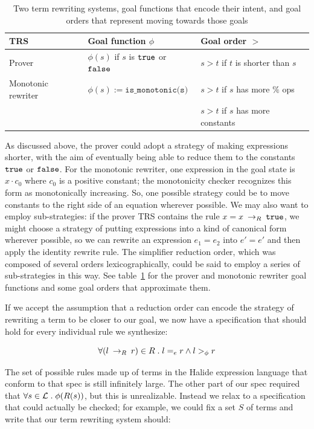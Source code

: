 \begin{table}[]
    \centering
    \begin{tabular}{|l|l|l|}
    \hline 
        TRS & Goal function $\phi$ & Goal order $>$ \\
        \hline 
        Prover &  $\phi(s)$ if $s$ is $\texttt{true}$ or $\texttt{false}$ & $s > t$ if $t$ is shorter than $s$\\
        \hline
        Monotonic rewriter & $\phi(s) := \texttt{is_monotonic(s)}$ & $s > t$ if $s$ has more $\%$ ops \\
                 & & $s > t$ if $s$ has more constants \\
        \hline
    \end{tabular}
    \caption{Two term rewriting systems, goal functions that encode their intent, and goal orders that represent moving towards those goals}
    \label{tab:trsspecs}
\end{table}

As discussed above, the prover could adopt a strategy of making expressions shorter, with the aim of eventually being able to reduce them to the constants $\texttt{true}$ or $\texttt{false}$. For the monotonic rewriter, one expression in the goal state is $x \cdot c_0$ where $c_0$ is a positive constant; the monotonicity checker recognizes this form as monotonically increasing. So, one possible strategy could be to move constants to the right side of an equation wherever possible. We may also want to employ sub-strategies: if the prover TRS contains the rule $x = x \:\rightarrow_{R}\: \texttt{true}$, we might choose a strategy of putting expressions into a kind of canonical form wherever possible, so we can rewrite an expression $e_1 = e_2$ into $e' = e'$ and then apply the identity rewrite rule. The simplifier reduction order, which was composed of several orders lexicographically, could be said to employ a series of sub-strategies in this way. See table~\ref{tab:trsspecs} for the prover and monotonic rewriter goal functions and some goal orders that approximate them.

If we accept the assumption that a reduction order can encode the strategy of rewriting a term to be closer to our goal, we now have a specification that should hold for every individual rule we synthesize:

\[ \forall (l \:\rightarrow_{R}\: r) \in R \;.\; l =_e r \wedge l >_{\phi} r
\]

The set of possible rules made up of terms in the Halide expression language that conform to that spec is still infinitely large. The other part of our spec required that $\forall s \in \mathcal{L} \;.\; \phi(R(s))$, but this is unrealizable. Instead we relax to a specification that could actually be checked; for example, we could fix a set $S$ of terms and write that our term rewriting system should:

